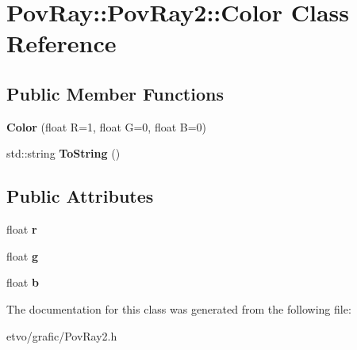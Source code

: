 \hypertarget{class_pov_ray_1_1_pov_ray2_1_1_color}{}\section{Pov\+Ray\+:\+:Pov\+Ray2\+:\+:Color Class Reference}
\label{class_pov_ray_1_1_pov_ray2_1_1_color}
\subsection*{Public Member Functions}
\begin{DoxyCompactItemize}
\item 
\mbox{\label{class_pov_ray_1_1_pov_ray2_1_1_color_a14d3b4d82e65897414173376488eb0ae}} 
{\bfseries Color} (float R=1, float G=0, float B=0)
\item 
\mbox{\label{class_pov_ray_1_1_pov_ray2_1_1_color_a86d339a9eb53cb2fd63d0e051675b0a1}} 
std\+::string {\bfseries To\+String} ()
\end{DoxyCompactItemize}
\subsection*{Public Attributes}
\begin{DoxyCompactItemize}
\item 
\mbox{\label{class_pov_ray_1_1_pov_ray2_1_1_color_a3f25183ed6fe781b5c49222ff7438a60}} 
float {\bfseries r}
\item 
\mbox{\label{class_pov_ray_1_1_pov_ray2_1_1_color_aacee6993ef722705b5ea5837c12924aa}} 
float {\bfseries g}
\item 
\mbox{\label{class_pov_ray_1_1_pov_ray2_1_1_color_a0c8d9f83d0914f63ab1b178aa0cd66ae}} 
float {\bfseries b}
\end{DoxyCompactItemize}


The documentation for this class was generated from the following file\+:\begin{DoxyCompactItemize}
\item 
etvo/grafic/Pov\+Ray2.\+h\end{DoxyCompactItemize}
